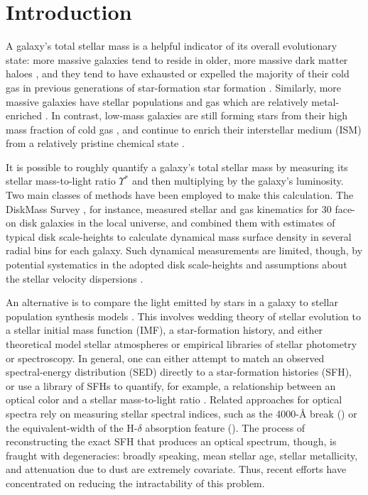 \section{Introduction}
\label{chap2:sec:intro}

A galaxy's total stellar mass is a helpful indicator of its overall evolutionary state: more massive galaxies tend to reside in older, more massive dark matter haloes \citep{gallazzi_charlot_05, gallazzi_06}, and they tend to have exhausted or expelled the majority of their cold gas in previous generations of star-formation star formation \citep{kauffmann_heckman_white_03, balogh_04_cmd, baldry_06_massquenching}. Similarly, more massive galaxies have stellar populations and gas which are relatively metal-enriched \citep{gallazzi_charlot_05, gallazzi_06}. In contrast, low-mass galaxies are still forming stars from their high mass fraction of cold gas \citep{mcgaugh_de-blok_97}, and continue to enrich their interstellar medium (ISM) from a relatively pristine chemical state \citep{tremonti_mz}.

It is possible to roughly quantify a galaxy's total stellar mass by measuring its stellar mass-to-light ratio $\Upsilon^*$ and then multiplying by the galaxy's luminosity. Two main classes of methods have been employed to make this calculation. The DiskMass Survey \citep[DMS, ][]{diskmass_i}, for instance, measured stellar and gas kinematics for 30 face-on disk galaxies in the local universe, and combined them with estimates of typical disk scale-heights to calculate dynamical mass surface density in several radial bins for each galaxy. Such dynamical measurements are limited, though, by potential systematics in the adopted disk scale-heights and assumptions about the stellar velocity dispersions \citep{aniyan_freeman_16, aniyan_freeman_18}.

An alternative is to compare the light emitted by stars in a galaxy to stellar population synthesis models \citep{tinsley_72, tinsley_73}. This involves wedding theory of stellar evolution to a stellar initial mass function (IMF), a star-formation history, and either theoretical model stellar atmospheres or empirical libraries of stellar photometry or spectroscopy. In general, one can either attempt to match an observed spectral-energy distribution (SED) directly to a star-formation histories (SFH), or use a library of SFHs to quantify, for example, a relationship between an optical color and a stellar mass-to-light ratio \citet{bell_dejong_01, bell_03}. Related approaches for optical spectra \citep{kauffmann_heckman_white_03} rely on measuring stellar spectral indices, such as the 4000-\mbox{\AA} break (\Dn) or the equivalent-width of the H-$\delta$ absorption feature (\HdeltaA). The process of reconstructing the exact SFH that produces an optical spectrum, though, is fraught with degeneracies: broadly speaking, mean stellar age, stellar metallicity, and attenuation due to dust are extremely covariate. Thus, recent efforts have concentrated on reducing the intractability of this problem.

